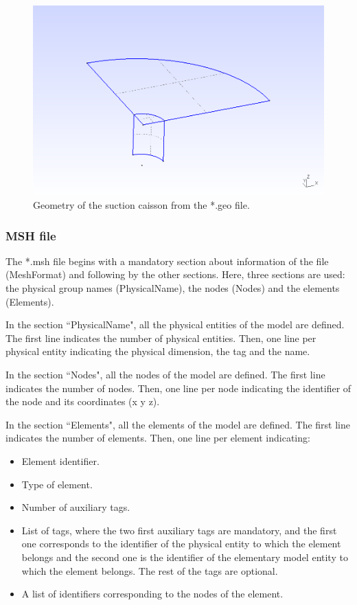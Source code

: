 \documentclass[a4]{article}
\begin{document}
\begin{figure}[tbh!]
	\centering
	\includegraphics[scale=0.6]{geometry_geo.png}
	\caption{Geometry of the suction caisson from the *.geo file.}
	\label{fig:geometry_geo}
\end{figure}

\subsubsection{MSH file}

The *.msh file begins with a mandatory section about information of the file (MeshFormat) and following by the other sections. Here, three sections are used: the physical group names (PhysicalName), the nodes (Nodes) and the elements (Elements).

In the section ``PhysicalName", all the physical entities of the model are defined. The first line indicates the number of physical entities. Then, one line per physical entity indicating the physical dimension, the tag and the name.  

In the section ``Nodes", all the nodes of the model are defined. The first line indicates the number of nodes. Then, one line per node indicating the identifier of the node and its coordinates (x y z).

In the section ``Elements", all the elements of the model are defined. The first line indicates the number of elements. Then, one line per element indicating:

\begin{itemize}
	\item Element identifier.
	\item Type of element.
	\item Number of auxiliary tags.
	\item List of tags, where the two first auxiliary tags are mandatory, and the first one corresponds to the identifier of the physical entity to which the element belongs and the second one is the identifier of the elementary model entity to which the element belongs. The rest of the tags are optional.
	\item A list of identifiers corresponding to the nodes of the element.
\end{itemize}
\end{document}
